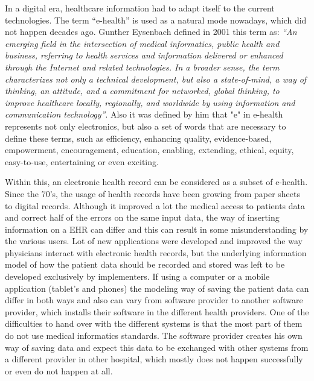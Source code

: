 \documentclass[mim_thesis.tex]{subfiles}
\begin{document}
In a digital era, healthcare information had to adapt itself to the current technologies. The term “e-health” is used as a natural mode nowadays, which did not happen decades ago. \citep{Eysenbach2001} Gunther Eysenbach defined in 2001 this term as: \textit{“An emerging field in the intersection of medical informatics, public health and business, referring to health services and information delivered or enhanced through the Internet and related technologies. In a broader sense, the term characterizes not only a technical development, but also a state-of-mind, a way of thinking, an attitude, and a commitment for networked, global thinking, to improve healthcare locally, regionally, and worldwide by using information and communication technology”}. Also it was defined by him that "e" in e-health represents not only electronics, but also a set of words that are necessary to define these terms, such as efficiency, enhancing quality, evidence-based, empowerment, encouragement, education, enabling, extending, ethical, equity, easy-to-use, entertaining or even exciting.

Within this, an electronic health record can be considered as a subset of e-health. Since the 70’s, the usage of health records have been growing from paper sheets to digital records. Although it improved a lot the medical access to patients data and correct half of the errors on the same input data, the way of inserting information on a EHR can differ and this can result in some misunderstanding by the various users. Lot of new applications were developed and improved the way physicians interact with electronic health records, but the underlying information model of how the patient data should be recorded and stored was left to be developed exclusively by implementers. If using a computer or a mobile application (tablet’s and phones) the modeling way of saving the patient data can differ in both ways and also can vary from software provider to another software provider, which installs their software in the different health providers. One of the difficulties to hand over with the different systems is that the most part of them do not use medical informatics standards. The software provider creates his own way of saving data and expect this data to be exchanged with other systems from a different provider in other hospital, which mostly does not happen successfully or even do not happen at all. 
\end{document}
